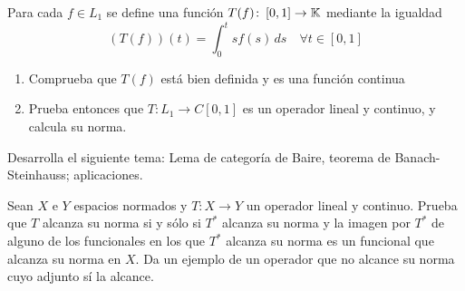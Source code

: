 \documentclass[12pt]{article}
\begin{document}
    \begin{ejercicio}
        Para cada $f \in L_1$ se define una función $T(f) \colon \left[0, 1\right] \to \mathbb{K}$ mediante la igualdad
        \[
            (T(f))(t) = \int_0^t s f(s) \, ds \quad \forall t \in \left[0, 1\right]
        \]
        \begin{enumerate}[label=\alph*)]
            \item Comprueba que $T(f)$ está bien definida y es una función continua
            \item Prueba entonces que $T \colon L_1 \to C\left[0, 1\right]$ es un operador lineal y continuo, y calcula su norma.
        \end{enumerate}
    \end{ejercicio}

    \begin{ejercicio}
        Desarrolla el siguiente tema: Lema de categoría de Baire, teorema de Banach-Steinhauss; aplicaciones.
    \end{ejercicio}

    \begin{ejercicio}[Extra]
        Sean $X$ e $Y$ espacios normados y $T \colon X \longrightarrow Y$ un operador lineal y continuo. Prueba que $T$ alcanza su norma si y sólo si $T^*$ alcanza su norma y la imagen por $T^*$ de alguno de los funcionales en los que $T^*$ alcanza su norma es un funcional que alcanza su norma en $X$. Da un ejemplo de un operador que no alcance su norma cuyo adjunto sí la alcance.
    \end{ejercicio}
\end{document}
